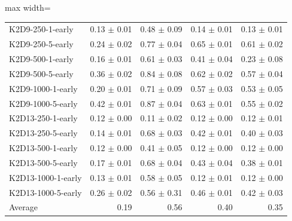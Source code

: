 \documentclass{article}
\begin{document}
\begin{table}[ht]
\begin{center}
\begin{small}
\begin{adjustbox}{max width=\columnwidth}
\begin{tabular}{l|rrrr}
K2D9-250-1-early & 0.13 $\pm$ 0.01 & 0.48 $\pm$ 0.09 & 0.14 $\pm$ 0.01 & 0.13 $\pm$ 0.01\\
K2D9-250-5-early & 0.24 $\pm$ 0.02 & 0.77 $\pm$ 0.04 & 0.65 $\pm$ 0.01 & 0.61 $\pm$ 0.02\\
K2D9-500-1-early & 0.16 $\pm$ 0.01 & 0.61 $\pm$ 0.03 & 0.41 $\pm$ 0.04 & 0.23 $\pm$ 0.08\\
K2D9-500-5-early & 0.36 $\pm$ 0.02 & 0.84 $\pm$ 0.08 & 0.62 $\pm$ 0.02 & 0.57 $\pm$ 0.04\\
K2D9-1000-1-early & 0.20 $\pm$ 0.01 & 0.71 $\pm$ 0.09 & 0.57 $\pm$ 0.03 & 0.53 $\pm$ 0.05\\
K2D9-1000-5-early & 0.42 $\pm$ 0.01 & 0.87 $\pm$ 0.04 & 0.63 $\pm$ 0.01 & 0.55 $\pm$ 0.02\\
K2D13-250-1-early & 0.12 $\pm$ 0.00 & 0.11 $\pm$ 0.02 & 0.12 $\pm$ 0.00 & 0.12 $\pm$ 0.01\\
K2D13-250-5-early & 0.14 $\pm$ 0.01 & 0.68 $\pm$ 0.03 & 0.42 $\pm$ 0.01 & 0.40 $\pm$ 0.03\\
K2D13-500-1-early & 0.12 $\pm$ 0.00 & 0.41 $\pm$ 0.05 & 0.12 $\pm$ 0.00 & 0.12 $\pm$ 0.00\\
K2D13-500-5-early & 0.17 $\pm$ 0.01 & 0.68 $\pm$ 0.04 & 0.43 $\pm$ 0.04 & 0.38 $\pm$ 0.01\\
K2D13-1000-1-early & 0.13 $\pm$ 0.01 & 0.58 $\pm$ 0.05 & 0.12 $\pm$ 0.01 & 0.12 $\pm$ 0.00\\
K2D13-1000-5-early & 0.26 $\pm$ 0.02 & 0.56 $\pm$ 0.31 & 0.46 $\pm$ 0.01 & 0.42 $\pm$ 0.03\\
\midrule
Average & 0.19 & 0.56 & 0.40 & 0.35\\
\end{tabular}
        \end{adjustbox}
    \end{small}
    \end{center}
    \vskip -0.1in
\end{table}
\end{document}

